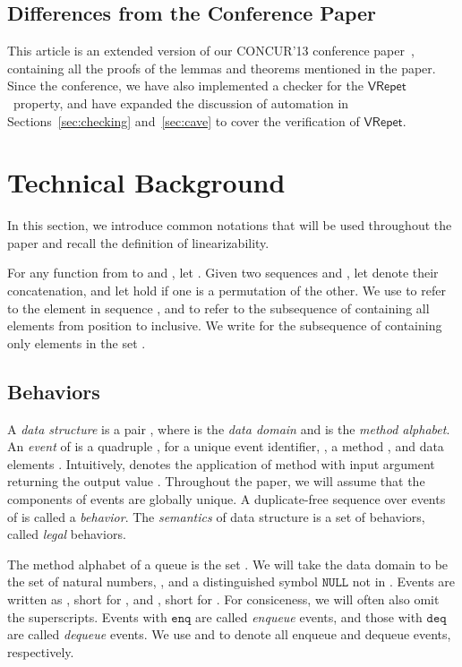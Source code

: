 \documentclass{LMCS}
\newcommand{\NULL}{\ensuremath{\mathtt{NULL}}}
\newcommand{\enq}{\ensuremath{\mathtt{enq}}}
\newcommand{\deq}{\ensuremath{\mathtt{deq}}}
\newcommand{\VRepet}{\ensuremath{\mathsf{VRepet}}}
\begin{document}
\subsection*{Differences from the Conference Paper}

This article is an extended version of our CONCUR'13 conference paper~\cite{HSV2013},
containing all the proofs of the lemmas and theorems mentioned in the paper.
Since the conference, we have also implemented a checker for the \VRepet\ property,
and have expanded the discussion of automation in Sections~\ref{sec:checking} 
and~\ref{sec:cave} to cover the verification of \VRepet.



\section{Technical Background}
\label{sec:back}

In this section, we introduce common notations that will be used throughout the paper and recall the definition of linearizability.

For any function  from  to  and , let .
Given two sequences  and , let  denote their concatenation, and let  hold if one is a permutation of the other.
We use  to refer to the  element in sequence ,
and  to refer to the subsequence of  containing all 
elements from position  to  inclusive.
We write  for the subsequence of  containing only
elements in the set .

\subsection*{Behaviors}

A {\em data structure}  is a pair , where  is the {\em data domain} and  is the {\em method alphabet}.
An {\em event} of  is a quadruple , for a unique event identifier, , a method , and data elements .
Intuitively,  denotes the application of method  with input argument  returning the output value .
Throughout the paper, we will assume that the  components of events are globally unique.
A duplicate-free sequence over events of  is called a {\em behavior}.
The {\em semantics} of data structure  is a set of behaviors, called {\em legal} behaviors.

The method alphabet  of a queue is the set .
We will take the data domain to be the set of natural numbers, , and a distinguished symbol {\NULL} not in .
Events are written as , short for , and , short for . For consiceness, we will often also omit the  superscripts.
Events with {\enq} are called {\em enqueue} events, and those with {\deq} are called {\em dequeue} events.
We use  and  to denote all enqueue and dequeue events, respectively.
\end{document}
